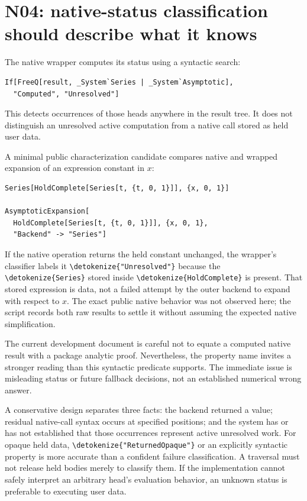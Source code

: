\documentclass[11pt,a4paper]{article}
\newcommand{\wl}[1]{\texttt{\expandafter\nolinkurl\expandafter{\detokenize{#1}}}}
\begin{document}
\section{N04: native-status classification should describe what it knows}

The native wrapper computes its status using a syntactic search:
\begin{lstlisting}
If[FreeQ[result, _System`Series | _System`Asymptotic],
  "Computed", "Unresolved"]
\end{lstlisting}
This detects occurrences of those heads anywhere in the result tree. It does
not distinguish an unresolved active computation from a native call stored as
held user data.\cite{native}

A minimal public characterization candidate compares native and wrapped expansion
of an expression constant in $x$:
\begin{lstlisting}
Series[HoldComplete[Series[t, {t, 0, 1}]], {x, 0, 1}]

AsymptoticExpansion[
  HoldComplete[Series[t, {t, 0, 1}]], {x, 0, 1},
  "Backend" -> "Series"]
\end{lstlisting}
If the native operation returns the held constant unchanged, the wrapper's
classifier labels it \wl{"Unresolved"} because the \wl{Series} stored inside
\wl{HoldComplete} is present. That stored expression is data, not a failed
attempt by the outer backend to expand with respect to $x$. The exact public
native behavior was not observed here; the script records both raw results to
settle it without assuming the expected native simplification.

The current development document is careful not to equate a computed native
result with a package analytic proof. Nevertheless, the property name invites a
stronger reading than this syntactic predicate supports. The immediate issue is
misleading status or future fallback decisions, not an established numerical
wrong answer.\cite{nativedoc}

A conservative design separates three facts: the backend returned a value;
residual native-call syntax occurs at specified positions; and the system has or
has not established that those occurrences represent active unresolved work.
For opaque held data, \wl{"ReturnedOpaque"} or an explicitly syntactic property
is more accurate than a confident failure classification. A traversal must not
release held bodies merely to classify them. If the implementation cannot safely
interpret an arbitrary head's evaluation behavior, an unknown status is preferable
to executing user data.
\end{document}
